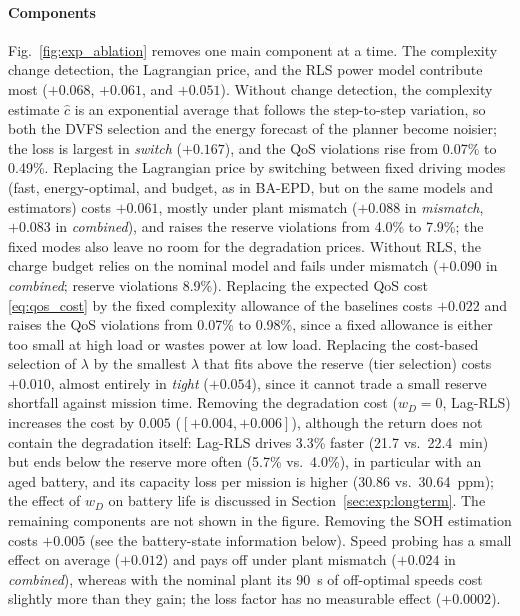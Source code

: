 \paragraph{Components}
Fig.~\ref{fig:exp_ablation} removes one main component at a time. The complexity change detection,
the Lagrangian price, and the \ac{RLS} power model contribute most ($+0.068$, $+0.061$, and $+0.051$).
Without change detection, the complexity estimate $\hat c$ is an exponential average that follows
the step-to-step variation, so both the \ac{DVFS} selection and the energy forecast of the planner
become noisier; the loss is largest in \emph{switch} ($+0.167$), and the \ac{QoS} violations rise
from 0.07\% to 0.49\%. Replacing the Lagrangian price by switching between fixed driving modes (fast,
energy-optimal, and budget, as in BA-EPD, but on the same models and estimators) costs $+0.061$,
mostly under plant mismatch ($+0.088$ in \emph{mismatch}, $+0.083$ in \emph{combined}), and raises the
reserve violations from 4.0\% to 7.9\%; the fixed modes also leave no room for the degradation prices.
Without \ac{RLS}, the charge budget relies on the nominal model and fails under mismatch ($+0.090$ in
\emph{combined}; reserve violations 8.9\%). Replacing the expected \ac{QoS} cost
\eqref{eq:qos_cost} by the fixed complexity allowance of the baselines costs $+0.022$ and raises the
\ac{QoS} violations from 0.07\% to 0.98\%, since a fixed allowance is either too small at high load
or wastes power at low load. Replacing the cost-based selection of $\lambda$ by the smallest
$\lambda$ that fits above the reserve (tier selection) costs $+0.010$, almost entirely in
\emph{tight} ($+0.054$), since it cannot trade a small reserve shortfall against mission time.
Removing the degradation cost ($w_D = 0$, Lag-RLS) increases the cost by $0.005$ ($[+0.004, +0.006]$),
although the return does not contain the degradation itself: Lag-RLS drives 3.3\% faster (21.7
vs.\ 22.4~min) but ends below the reserve more often (5.7\% vs.\ 4.0\%), in particular with an aged
battery, and its capacity loss per mission is higher (30.86 vs.\ 30.64~ppm); the effect of $w_D$ on
battery life is discussed in Section~\ref{sec:exp:longterm}. The remaining components are not shown in
the figure. Removing the \ac{SOH} estimation costs $+0.005$ (see the battery-state information
below). Speed probing has a small effect on average ($+0.012$) and pays off under plant mismatch
($+0.024$ in \emph{combined}), whereas with the nominal plant its 90~s of off-optimal speeds cost
slightly more than they gain; the loss factor has no measurable effect ($+0.0002$).

